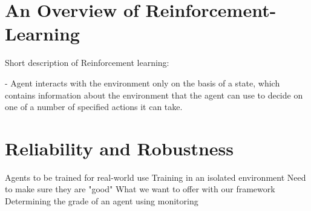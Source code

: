 \section{An Overview of Reinforcement-Learning}

Short description of Reinforcement learning:

- Agent interacts with the environment only on the basis of a state, which contains information about the 
environment that the agent can use to decide on one of a number of specified actions it can take.

\section{Reliability and Robustness}


Agents to be trained for real-world use
Training in an isolated environment
Need to make sure they are "good"
What we want to offer with our framework
Determining the grade of an agent using monitoring